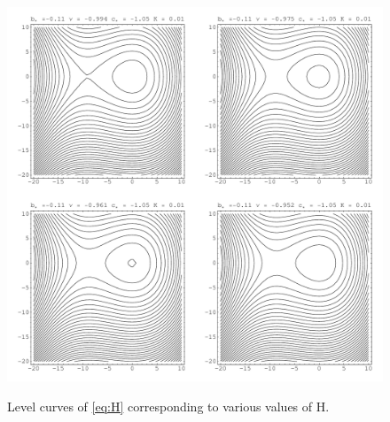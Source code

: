 \begin{figure}[hh] \begin{center}
\includegraphics[width=1.0\textwidth]{figures/figure2-1c}
\label{fig:homoclinic2} \caption{Level curves of \eqref{eq:H} corresponding to
various values of H.} \end{center} \end{figure}
